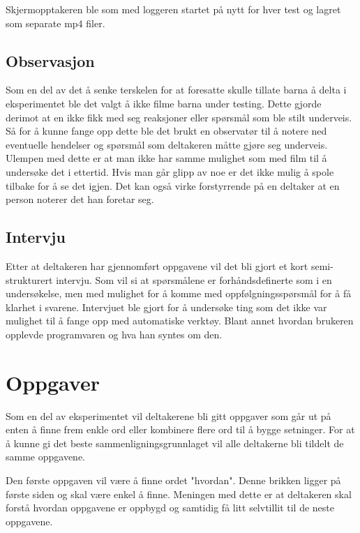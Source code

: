 Skjermopptakeren ble som med loggeren startet på nytt for hver test og lagret som separate mp4 filer. 


\subsection{Observasjon}

Som en del av det å senke terskelen for at foresatte skulle tillate barna å delta i eksperimentet ble det valgt å ikke filme barna under testing. Dette gjorde derimot at en ikke fikk med seg reaksjoner eller spørsmål som ble stilt underveis. Så for å kunne fange opp dette ble det brukt en observatør til å notere ned eventuelle hendelser og spørsmål som deltakeren måtte gjøre seg underveis. Ulempen med dette er at man ikke har samme mulighet som med film til å undersøke det i ettertid. Hvis man går glipp av noe er det ikke mulig å spole tilbake for å se det igjen. Det kan også virke forstyrrende på en deltaker at en person noterer det han foretar seg. 



\subsection{Intervju}

Etter at deltakeren har gjennomført oppgavene vil det bli gjort et kort semi-strukturert intervju. Som vil si at spørsmålene er forhåndsdefinerte som i en undersøkelse, men med mulighet for å komme med oppfølgningsspørsmål for å få klarhet i svarene. Intervjuet ble gjort for å undersøke ting som det ikke var mulighet til å fange opp med automatiske verktøy. Blant annet hvordan brukeren opplevde programvaren og hva han syntes om den.


\section{Oppgaver}

Som en del av eksperimentet vil deltakerene bli gitt oppgaver som går ut på enten å finne frem enkle ord eller kombinere flere ord til å bygge setninger. For at å kunne gi det beste sammenligningsgrunnlaget vil alle deltakerne bli tildelt de samme oppgavene.

Den første oppgaven vil være å finne ordet "hvordan". Denne brikken ligger på første siden og skal være enkel å finne. Meningen med dette er at deltakeren skal forstå hvordan oppgavene er oppbygd og samtidig få litt selvtillit til de neste oppgavene.

